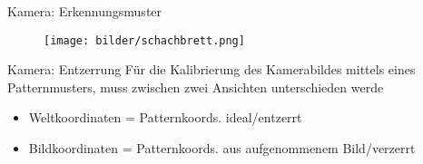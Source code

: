 
\begin{frame}{Kamera: Erkennungsmuster}
	\begin{figure}[h]
		\centering
		\texttt{[image: bilder/schachbrett.png]}
	\end{figure}

\end{frame}


\begin{frame}{Kamera: Entzerrung}
Für die Kalibrierung des Kamerabildes mittels eines Patternmusters, muss zwischen zwei Ansichten unterschieden werde
	\begin{itemize}
		\item Weltkoordinaten = Patternkoords. ideal/entzerrt
		\item Bildkoordinaten = Patternkoords. aus aufgenommenem Bild/verzerrt
	\end{itemize}
\end{frame}

